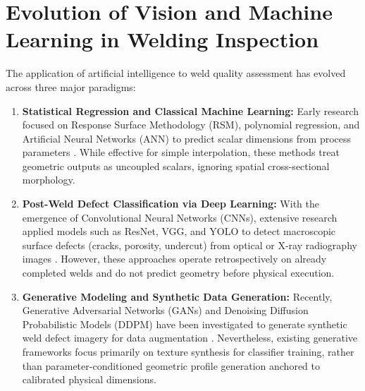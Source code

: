 \documentclass[12pt,a4paper,oneside]{report}
\begin{document}
\section{Evolution of Vision and Machine Learning in Welding Inspection}
The application of artificial intelligence to weld quality assessment has evolved across three major paradigms:
\begin{enumerate}
    \item \textbf{Statistical Regression and Classical Machine Learning:} Early research focused on Response Surface Methodology (RSM), polynomial regression, and Artificial Neural Networks (ANN) to predict scalar dimensions from process parameters \cite{annp, li2021}. While effective for simple interpolation, these methods treat geometric outputs as uncoupled scalars, ignoring spatial cross-sectional morphology.
    \item \textbf{Post-Weld Defect Classification via Deep Learning:} With the emergence of Convolutional Neural Networks (CNNs), extensive research applied models such as ResNet, VGG, and YOLO to detect macroscopic surface defects (cracks, porosity, undercut) from optical or X-ray radiography images \cite{yousif2023, eren2026}. However, these approaches operate retrospectively on already completed welds and do not predict geometry before physical execution.
    \item \textbf{Generative Modeling and Synthetic Data Generation:} Recently, Generative Adversarial Networks (GANs) and Denoising Diffusion Probabilistic Models (DDPM) have been investigated to generate synthetic weld defect imagery for data augmentation \cite{cao2026, cheng2026}. Nevertheless, existing generative frameworks focus primarily on texture synthesis for classifier training, rather than parameter-conditioned geometric profile generation anchored to calibrated physical dimensions.
\end{enumerate}
\end{document}
